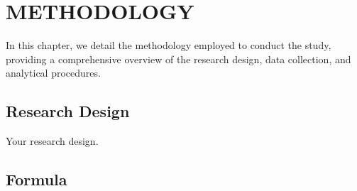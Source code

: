\chapter{METHODOLOGY}

	In this chapter, we detail the methodology employed to conduct the study, providing a comprehensive overview of the research design, data collection, and analytical procedures.
	
	\section{Research Design}
	Your research design.
	
	\section{Formula}
